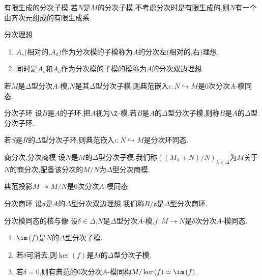 \begin{corollary}{有限生成的分次子模}{}
	若$N$是$M$的分次子模,不考虑分次时是有限生成的,则$N$有一个由齐次元组成的有限生成系.
\end{corollary}

\begin{definition}{分次理想}{}
	\begin{enumerate}
		\item $A_{s}$(相对的,$A_{d}$)作为分次模的子模称为$A$的分次左(相对的,右)理想.
		\item 同时是$A_{s}$和$A_{d}$作为分次模的子模的模称为$A$的分次双边理想.
	\end{enumerate}
\end{definition}

\begin{remark}{}{}
	若$M$是$\Delta$型分次$A$-模,$N$是其$\Delta$型分次子模,则典范嵌入$\iota:N\hookrightarrow M$是$0$次分次$A$-模同态.
\end{remark}

\begin{definition}{分次子环}{}
	设$B$是$A$的子环.把$A$视为$\Z$-模,若$B$是$A$的$\Delta$型分次子模,则称$B$是$A$的$\Delta$型分次子环.
\end{definition}

\begin{remark}{}{}
	若$S$是$R$的$\Delta$型分次子环,则典范嵌入$\iota:N\hookrightarrow M$是分次环同态.
\end{remark}

\begin{definition}{商分次,分次商模}{}
	设$N$是$M$的$\Delta$型分次子模.我们称$\left(\left(M_{\lambda}+N\right)/N\right)_{\lambda\in\Delta}$为$M$关于$N$的商分次,配备该分次的$M/N$为$\Delta$型分次商模.
\end{definition}

\begin{remark}{}{}
	典范投影$M\twoheadrightarrow M/N$是$0$次分次$A$-模同态.
\end{remark}

\begin{definition}{分次商环}{}
	设$\mathfrak{a}$是$A$的$\Delta$型分次双边理想.我们称$R/\mathfrak{a}$是$\Delta$型分次商环.
\end{definition}

\begin{proposition}{分次模同态的核与像}{}
	设$\delta\in\Delta$,$N$是$\Delta$型分次$A$-模,$f:M\to N$是$\delta$次分次$A$-模同态.
	\begin{enumerate}
		\item $\im\left(f\right)$是$N$的$\Delta$型分次子模.
		\item 若$\delta$可消去,则$\ker\left(f\right)$是$M$的$\Delta$型分次子模.
		\item 若$\delta=0$,则有典范的$0$次分次$A$-模同构$M/\ker\left(f\right)\simeq\im\left(f\right)$.
	\end{enumerate}
\end{proposition}

